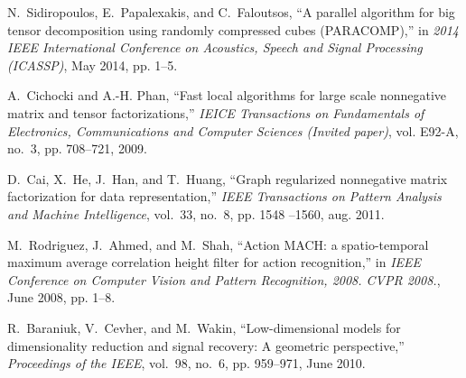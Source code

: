 \documentclass[10pt,twocolumn,twoside]{IEEEtran}
\begin{document}
\begin{thebibliography}{10}
N.~Sidiropoulos, E.~Papalexakis, and C.~Faloutsos, ``A parallel algorithm for
  big tensor decomposition using randomly compressed cubes ({PARACOMP}),'' in
  \emph{2014 IEEE International Conference on Acoustics, Speech and Signal
  Processing (ICASSP)}, May 2014, pp. 1--5.

A.~Cichocki and A.-H. Phan, ``Fast local algorithms for large scale nonnegative
  matrix and tensor factorizations,'' \emph{IEICE Transactions on Fundamentals
  of Electronics, Communications and Computer Sciences (Invited paper)}, vol.
  E92-A, no.~3, pp. 708--721, 2009.

D.~Cai, X.~He, J.~Han, and T.~Huang, ``Graph regularized nonnegative matrix
  factorization for data representation,'' \emph{IEEE Transactions on Pattern
  Analysis and Machine Intelligence}, vol.~33, no.~8, pp. 1548 --1560, aug.
  2011.

M.~Rodriguez, J.~Ahmed, and M.~Shah, ``Action {MACH}: a spatio-temporal maximum
  average correlation height filter for action recognition,'' in \emph{IEEE
  Conference on Computer Vision and Pattern Recognition, 2008. CVPR 2008.},
  June 2008, pp. 1--8.

R.~Baraniuk, V.~Cevher, and M.~Wakin, ``Low-dimensional models for
  dimensionality reduction and signal recovery: A geometric perspective,''
  \emph{Proceedings of the IEEE}, vol.~98, no.~6, pp. 959--971, June 2010.

\end{thebibliography}
 
\end{document}
